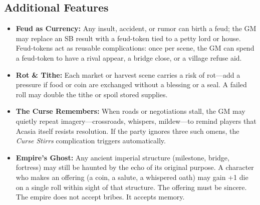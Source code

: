 \subsection*{Additional Features}
\begin{itemize}
\item \textbf{Feud as Currency:} Any insult, accident, or rumor can birth a feud; the GM may replace an SB result with a feud-token tied to a petty lord or house. Feud-tokens act as reusable complications: once per scene, the GM can spend a feud-token to have a rival appear, a bridge close, or a village refuse aid.
\item \textbf{Rot \& Tithe:} Each market or harvest scene carries a risk of rot---add a pressure if food or coin are exchanged without a blessing or a seal. A failed roll may double the tithe or spoil stored supplies.
\item \textbf{The Curse Remembers:} When roads or negotiations stall, the GM may quietly repeat imagery---crossroads, whispers, mildew---to remind players that Acasia itself resists resolution. If the party ignores three such omens, the \emph{Curse Stirrs} complication triggers automatically.
\item \textbf{Empire's Ghost:} Any ancient imperial structure (milestone, bridge, fortress) may still be haunted by the echo of its original purpose. A character who makes an offering (a coin, a salute, a whispered oath) may gain +1 die on a single roll within sight of that structure. The offering must be sincere. The empire does not accept bribes. It accepts memory.
\end{itemize}

